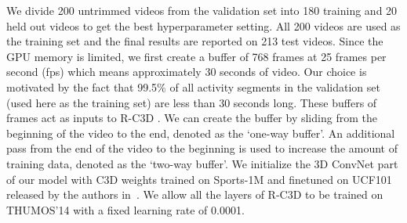 \documentclass[10pt,twocolumn,letterpaper]{article}
\newcommand{\modelname}[0]{R-C3D }
\begin{document}
We divide 200 untrimmed videos from the validation set into 180 training and 20 held out videos to get the best hyperparameter setting.
All 200 videos are used as the training set and the final results are reported on 213 test videos.
Since the GPU memory is limited, we first create a buffer of 768 frames at 25 frames per second (fps) which means approximately 30 seconds of video.
Our choice is motivated by the fact that 99.5\% of all activity segments in the validation set (used here as the training set) are less than 30 seconds long.
These buffers of frames act as inputs to \modelname.
We can create the buffer by sliding from the beginning of the video to the end, denoted as the `one-way buffer'.
An additional pass from the end of the video to the beginning is used to increase the amount of training data, denoted as the `two-way buffer'.
We initialize the 3D ConvNet part of our model with C3D weights trained on Sports-1M and finetuned on UCF101 released by the authors in~\cite{tran2015learning}.
We allow all the layers of \modelname to be trained on THUMOS'14 with a fixed learning rate of 0.0001.
\end{document}
